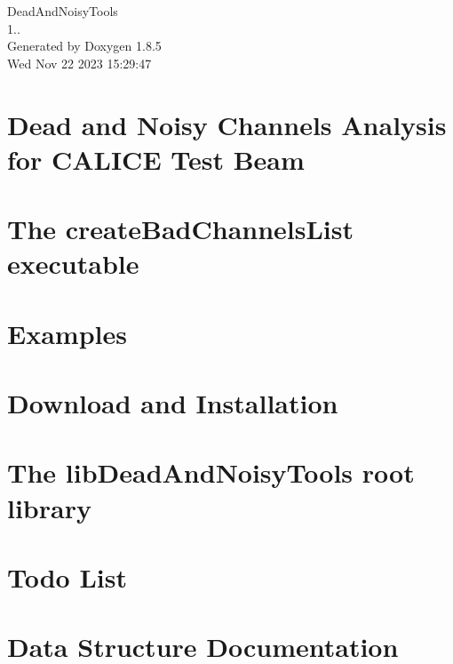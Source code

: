 \documentclass[twoside]{book}
\newcommand{\clearemptydoublepage}{%
  \newpage{\pagestyle{empty}\cleardoublepage}%
}
\begin{document}
\hypersetup{pageanchor=false}
\begin{titlepage}
\vspace*{7cm}
\begin{center}%
{\Large Dead\-And\-Noisy\-Tools \\[1ex]\large 1.. }\\
\vspace*{1cm}
{\large Generated by Doxygen 1.8.5}\\
\vspace*{0.5cm}
{\small Wed Nov 22 2023 15:29:47}\\
\end{center}
\end{titlepage}
\clearemptydoublepage
\tableofcontents
\clearemptydoublepage
{}
\hypersetup{pageanchor=true}

\chapter{Dead and Noisy Channels Analysis for C\-A\-L\-I\-C\-E Test Beam}
\label{index}\hypertarget{index}{}
\chapter{The create\-Bad\-Channels\-List executable}
\label{create_bad_channels_list_exe}
\hypertarget{create_bad_channels_list_exe}{}

\chapter{Examples}
\label{_examples}
\hypertarget{_examples}{}

\chapter{Download and Installation}
\label{download_install}
\hypertarget{download_install}{}

\chapter{The lib\-Dead\-And\-Noisy\-Tools root library}
\label{root_lib}
\hypertarget{root_lib}{}

\chapter{Todo List}
\label{todo}
\hypertarget{todo}{}

\chapter{Data Structure Documentation}








\end{document}
